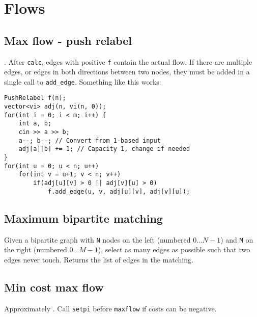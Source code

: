 \section{Flows}

\subsection{Max flow - push relabel}
. After \verb|calc|, edges with positive \verb|f| contain the actual flow.
\warning If there are multiple edges, or edges in both directions between two nodes, they must be added in a single call to \texttt{add\_edge}.
Something like this works:
\begin{lstlisting}
PushRelabel f(n);
vector<vi> adj(n, vi(n, 0));
for(int i = 0; i < m; i++) {
	int a, b;
	cin >> a >> b;
	a--; b--; // Convert from 1-based input
	adj[a][b] += 1; // Capacity 1, change if needed
}
for(int u = 0; u < n; u++)
	for(int v = u+1; v < n; v++)
		if(adj[u][v] > 0 || adj[v][u] > 0)
			f.add_edge(u, v, adj[u][v], adj[v][u]);
\end{lstlisting}


\subsection{Maximum bipartite matching}
Given a bipartite graph with \verb|N| nodes on the left (numbered $0 \ldots N-1$) and \verb|M| on the right (numbered $0 \ldots M-1$), select as many edges as possible such that two edges never touch. Returns the list of edges in the matching.


\subsection{Min cost max flow}
Approximately . Call \texttt{setpi} before \texttt{maxflow} if costs can be negative.

